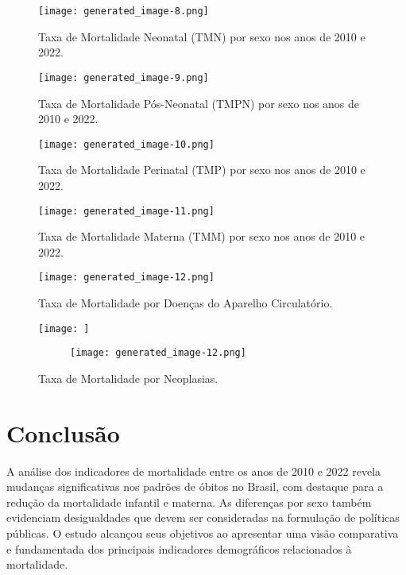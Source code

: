 \documentclass[12pt]{article}
\begin{document}
\begin{figure}[H]
    \centering
    \begin{minipage}[b]{0.48\textwidth}
        \texttt{[image: generated\_image-8.png]}
        \caption{Taxa de Mortalidade Neonatal (TMN) por sexo nos anos de 2010 e 2022.}
    \end{minipage}
    \hfill
    \begin{minipage}[b]{0.48\textwidth}
        \texttt{[image: generated\_image-9.png]}
        \caption{Taxa de Mortalidade Pós-Neonatal (TMPN) por sexo nos anos de 2010 e 2022.}
    \end{minipage}
\end{figure}

\begin{figure}[H]
    \centering
    \begin{minipage}[b]{0.48\textwidth}
        \texttt{[image: generated\_image-10.png]}
        \caption{Taxa de Mortalidade Perinatal (TMP) por sexo nos anos de 2010 e 2022.}
    \end{minipage}
    \hfill
    \begin{minipage}[b]{0.48\textwidth}
        \texttt{[image: generated\_image-11.png]}
        \caption{Taxa de Mortalidade Materna (TMM) por sexo nos anos de 2010 e 2022.}
    \end{minipage}
\end{figure}

\begin{figure}[H]
    \centering
    \begin{minipage}{0.48\textwidth}
        \texttt{[image: generated\_image-12.png]}
        \caption{Taxa de Mortalidade por Doenças do Aparelho Circulatório.}
    \end{minipage}
    \hfill
    \begin{minipage}{0.48\textwidth}
        \texttt{[image: ]}
\begin{figure}
            \centering
            \texttt{[image: generated\_image-12.png]}
            \label{fig:placeholder}
        \end{figure}
                \caption{Taxa de Mortalidade por Neoplasias.}
    \end{minipage}
\end{figure}

\section{Conclusão}
A análise dos indicadores de mortalidade entre os anos de 2010 e 2022 revela mudanças significativas nos padrões de óbitos no Brasil, com destaque para a redução da mortalidade infantil e materna. As diferenças por sexo também evidenciam desigualdades que devem ser consideradas na formulação de políticas públicas. O estudo alcançou seus objetivos ao apresentar uma visão comparativa e fundamentada dos principais indicadores demográficos relacionados à mortalidade.
\end{document}

